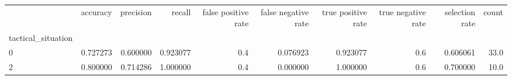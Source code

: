 \begin{tabular}{lrrrrrrrrr}
\toprule
{} &  accuracy &  precision &    recall &  false positive rate &  false negative rate &  true positive rate &  true negative rate &  selection rate &  count \\
tactical\_situation &           &            &           &                      &                      &                     &                     &                 &        \\
\midrule
0                  &  0.727273 &   0.600000 &  0.923077 &                  0.4 &             0.076923 &            0.923077 &                 0.6 &        0.606061 &   33.0 \\
2                  &  0.800000 &   0.714286 &  1.000000 &                  0.4 &             0.000000 &            1.000000 &                 0.6 &        0.700000 &   10.0 \\
\bottomrule
\end{tabular}
